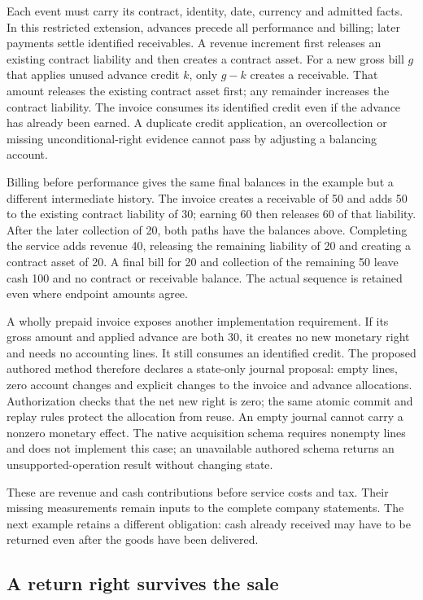 Each event must carry its contract, identity, date, currency and admitted
facts. In this restricted extension, advances precede all performance and
billing; later payments settle identified receivables. A revenue increment
first releases an existing contract liability and then creates a contract asset.
For a new gross bill $g$ that applies unused advance credit $k$, only $g-k$
creates a receivable. That amount releases the existing contract asset first;
any remainder increases the contract liability. The invoice consumes its
identified credit even if the advance has already been earned. A duplicate
credit application, an overcollection or missing unconditional-right evidence
cannot pass by adjusting a balancing account.

Billing before performance gives the same final balances in the example but
a different intermediate history. The invoice creates a receivable of 50 and
adds 50 to the existing contract liability of 30; earning 60 then releases 60
of that liability. After the later collection of 20, both paths have the
balances above. Completing the service adds revenue 40, releasing the remaining
liability of 20 and creating a contract asset of 20. A final bill for 20 and
collection of the remaining 50 leave cash 100 and no contract or receivable
balance. The actual sequence is retained even where endpoint amounts agree.

A wholly prepaid invoice exposes another implementation requirement. If its
gross amount and applied advance are both 30, it creates no new monetary right
and needs no accounting lines. It still consumes an identified credit. The
proposed authored method therefore declares a state-only journal proposal:
empty lines, zero account changes and explicit changes to the invoice and
advance allocations. Authorization checks that the net new right is zero;
the same atomic commit and replay rules protect the allocation from reuse.
An empty journal cannot carry a nonzero monetary effect. The native acquisition
schema requires nonempty lines and does not implement this case; an unavailable
authored schema returns an unsupported-operation result without changing state.

These are revenue and cash contributions before service costs and tax. Their
missing measurements remain inputs to the complete company statements. The
next example retains a different obligation: cash already received may have
to be returned even after the goods have been delivered.

\subsection{A return right survives the sale}
\label{sec:customer-returns}

